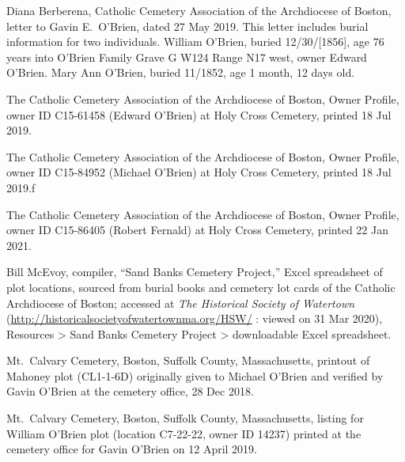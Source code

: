 \begin{thebibliography}{99}

Diana Berberena, Catholic Cemetery Association of the Archdiocese of Boston, letter to Gavin E.\ O'Brien, dated 27 May 2019. This letter includes burial information for two individuals. William O'Brien, buried 12/30/[1856], age 76 years into O'Brien Family Grave G W124 Range N17 west, owner Edward O'Brien. Mary Ann O'Brien, buried 11/1852, age 1 month, 12 days old.

The Catholic Cemetery Association of the Archdiocese of Boston, Owner Profile, owner ID C15-61458 (Edward O'Brien) at Holy Cross Cemetery, printed 18 Jul 2019.

The Catholic Cemetery Association of the Archdiocese of Boston, Owner Profile, owner ID C15-84952 (Michael O'Brien) at Holy Cross Cemetery, printed 18 Jul 2019.ƒ

The Catholic Cemetery Association of the Archdiocese of Boston, Owner Profile, owner ID C15-86405 (Robert Fernald) at Holy Cross Cemetery, printed 22 Jan 2021.

Bill McEvoy, compiler, ``Sand Banks Cemetery Project,'' Excel spreadsheet of plot locations, sourced from burial books and cemetery lot cards of the Catholic Archdiocese of Boston; accessed at \textit{The Historical Society of Watertown} (\url{http://historicalsocietyofwatertownma.org/HSW/} : viewed on 31 Mar 2020), Resources > Sand Banks Cemetery Project > downloadable Excel spreadsheet.

Mt.\ Calvary Cemetery, Boston, Suffolk County, Massachusetts, printout of Mahoney plot (CL1-1-6D) originally given to Michael O'Brien and verified by Gavin O'Brien at the cemetery office, 28 Dec 2018.

Mt.\ Calvary Cemetery, Boston, Suffolk County, Massachusetts, listing for William O'Brien plot (location C7-22-22, owner ID 14237) printed at the cemetery office for Gavin O'Brien on 12 April 2019.

\end{thebibliography}
